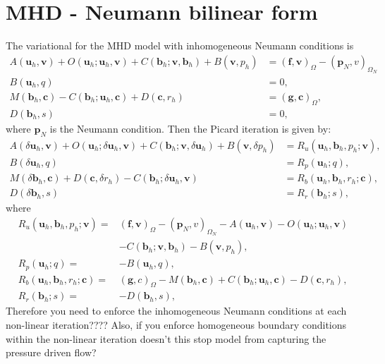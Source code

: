 \documentclass{article}
\newcommand{\uu}[1]{\boldsymbol #1}
\begin{document}
\section*{MHD - Neumann bilinear form}

The variational for the MHD model with inhomogeneous Neumann conditions is
\begin{equation}
\label{eq:VariationForm}
\begin{split}
A(\uu{u}_h,\uu{v}) + O(\uu{u}_h;\uu{u}_h,\uu{v}) +C(\uu{b}_h;\uu{v},\uu{b}_h) +B(\uu{v}, p_h) & =  (\uu{f},\uu{v})_\Omega - (\uu{p_N},v)_{\Omega_N}\\
B(\uu{u}_h,q)&= 0, \\
M(\uu{b}_h,\uu{c})-C(\uu{b}_h;\uu{u}_h,\uu{c})+ D(\uu{c},r_h)&= (\uu{g},\uu{c})_\Omega,\\
D(\uu{b}_h,s)&=0,
\end{split}
\end{equation}
where $\uu{p_N}$ is the Neumann condition. Then the Picard iteration is given by:
\begin{equation}
\label{eq:picard}
\begin{split}
A(\delta\uu{u}_h, \uu{v}) +O({\uu{u}_h};\delta\uu{u}_h,\uu{v})+ C(\uu{b}_h;\uu{v},\delta \uu{u}_h) + B(\uu{v}, \delta p_h) & = R_u(\uu{u}_h,\uu{b}_h,p_h;\uu{v}),\\
B(\delta\uu{u}_h,q)&= R_p(\uu{u}_h;q),\\
M(\delta \uu{b}_h,\uu{c})+
D(\uu{c},\delta r_h)-C(\uu{b}_h;\delta \uu{u}_h,\uu{v})&= R_b(\uu{u}_h,\uu{b}_h,r_h;\uu{c}),\\
D(\delta \uu{b}_h,s)&= R_r(\uu{b}_h;s),
\end{split}
\end{equation}
where
\begin{equation}
\label{eq:RHSpicard}
\begin{split}
 R_u(\uu{u}_h,\uu{b}_h,p_h;\uu{v})=&(\uu{f}, \uu{v})_\Omega- (\uu{p_N},v)_{\Omega_N}-A(\uu{u}_h,\uu{v})
-  O(\uu{u}_h;\uu{u}_h,\uu{v})\\
& - C(\uu{b}_h;\uu{v},\uu{b}_h)-B(\uu{v},p_h),\\
R_p(\uu{u}_h;q)=&-B(\uu{u}_h,q),\\
 R_b(\uu{u}_h,\uu{b}_h,r_h;\uu{c})=&(\uu{g,c})_\Omega -M(\uu{b}_h,\uu{c})
+ C(\uu{b}_h;\uu{u}_h,\uu{c})-D(\uu{c},r_h),\\
R_r(\uu{b}_h;s)=&-D(\uu{b}_h,s),
\end{split}
\end{equation}
Therefore you need to enforce the inhomogeneous Neumann conditions at each non-linear iteration???? Also, if you enforce homogeneous boundary conditions within the non-linear iteration doesn't this stop model from capturing the pressure driven flow?
\end{document}
